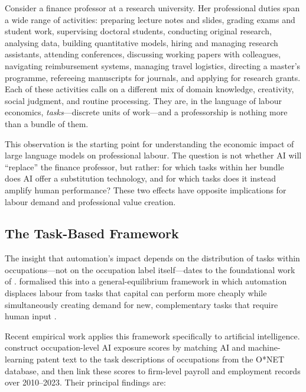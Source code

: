 \begin{context}
Consider a finance professor at a research university.  Her professional
duties span a wide range of activities: preparing lecture notes and slides,
grading exams and student work, supervising doctoral students, conducting
original research, analysing data, building quantitative models, hiring and
managing research assistants, attending conferences, discussing working papers
with colleagues, navigating reimbursement systems, managing travel logistics,
directing a master's programme, refereeing manuscripts for journals, and
applying for research grants.  Each of these activities calls on a different
mix of domain knowledge, creativity, social judgment, and routine processing.
They are, in the language of labour economics, \emph{tasks}---discrete units
of work---and a professorship is nothing more than a bundle of them.

This observation is the starting point for understanding the economic impact
of large language models on professional labour.  The question is not whether
AI will ``replace'' the finance professor, but rather: for which tasks within
her bundle does AI offer a substitution technology, and for which tasks does
it instead amplify human performance?  These two effects have opposite
implications for labour demand and professional value creation.

\subsection{The Task-Based Framework}
\label{sec:tasks-framework}

The insight that automation's impact depends on the distribution of tasks
within occupations---not on the occupation label itself---dates to the
foundational work of \citet{autor2003skill}.
\citeauthor{acemoglu2019automation} formalised this into a general-equilibrium
framework in which automation displaces labour from tasks that capital can perform
more cheaply while simultaneously creating demand for new, complementary tasks that
require human input \cite{acemoglu2019automation}.

Recent empirical work applies this framework specifically to artificial
intelligence.  \citet{hampole2025ai} construct occupation-level AI exposure
scores by matching AI and machine-learning patent text to the task descriptions
of occupations from the O*NET database, and then link these scores to
firm-level payroll and employment records over 2010--2023.  Their principal
findings are:


\end{context}

